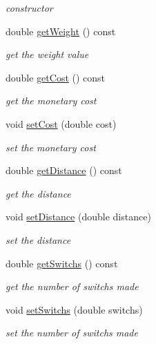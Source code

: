 \begin{DoxyCompactItemize}
\begin{DoxyCompactList}\small\item\em constructor \end{DoxyCompactList}\item 
double \hyperlink{class_weight_info_a71c15e39640780d0c7a6188bc9c5b1f7}{get\+Weight} () const 
\begin{DoxyCompactList}\small\item\em get the weight value \end{DoxyCompactList}\item 
double \hyperlink{class_weight_info_a95cd81eace69fa37d8200cbf503ecbbc}{get\+Cost} () const 
\begin{DoxyCompactList}\small\item\em get the monetary cost \end{DoxyCompactList}\item 
void \hyperlink{class_weight_info_abe97f95f7e4fbfda379879e56ba67b82}{set\+Cost} (double cost)
\begin{DoxyCompactList}\small\item\em set the monetary cost \end{DoxyCompactList}\item 
double \hyperlink{class_weight_info_a2939a18c59d106925c3ff1559eaae292}{get\+Distance} () const 
\begin{DoxyCompactList}\small\item\em get the distance \end{DoxyCompactList}\item 
void \hyperlink{class_weight_info_aeecd1a648ca9ca739a9009c2eff63fbb}{set\+Distance} (double distance)
\begin{DoxyCompactList}\small\item\em set the distance \end{DoxyCompactList}\item 
double \hyperlink{class_weight_info_a82dba83714cd8449f08ee632e73dd52c}{get\+Switchs} () const 
\begin{DoxyCompactList}\small\item\em get the number of switchs made \end{DoxyCompactList}\item 
void \hyperlink{class_weight_info_a2434a03bba38b88078d27c4de0a4964e}{set\+Switchs} (double switchs)
\begin{DoxyCompactList}\small\item\em set the number of switchs made \end{DoxyCompactList}\item 

\end{DoxyCompactItemize}
